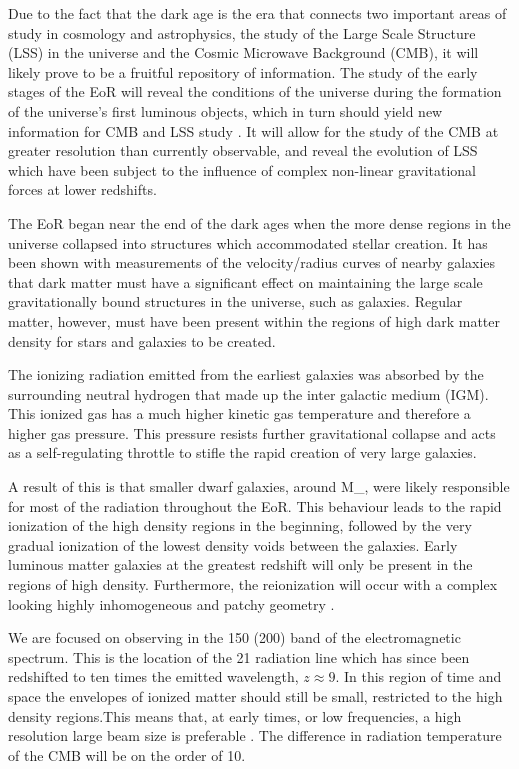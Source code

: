 \documentclass[a4paper,12pt]{article}
\begin{document}
Due to the fact that the dark age is the era that connects two important areas of study in cosmology and astrophysics, the study of the Large Scale Structure (LSS) in the universe and the Cosmic Microwave Background (CMB), it will likely prove to be a fruitful repository of information. The study of the early stages of the EoR will reveal the conditions of the universe during the formation of the universe’s first luminous objects, which in turn should yield new information for CMB and LSS study \citep{21cminthedark}. It will allow for the study of the CMB at greater resolution than currently observable, and reveal the evolution of LSS which have been subject to the influence of complex non-linear gravitational forces at lower redshifts.

The EoR began near the end of the dark ages when the more dense regions in the universe collapsed into structures which accommodated stellar creation. It has been shown with measurements of the velocity/radius curves of nearby galaxies that dark matter must have a significant effect on maintaining the large scale gravitationally bound structures in the universe, such as galaxies. Regular matter, however, must have been present within the regions of high dark matter density for stars and galaxies to be created. 

The ionizing radiation emitted from the earliest galaxies was absorbed by the surrounding neutral hydrogen that made up the inter galactic medium (IGM). This ionized gas has a much higher kinetic gas temperature and therefore a higher gas pressure. This pressure resists further gravitational collapse and acts as a self-regulating throttle to stifle the rapid creation of very large galaxies. 

A result of this is that smaller dwarf galaxies, around \unit{}{M_{\odot}}\citep{theoryandsim}, were likely responsible for most of the radiation throughout the EoR. This behaviour leads to the rapid ionization of the high density regions in the beginning, followed by the very gradual ionization of the lowest density voids between the galaxies. Early luminous matter galaxies at the greatest redshift will only be present in the regions of high density. Furthermore, the reionization will occur with a complex looking highly inhomogeneous and patchy geometry \citep{characteranddetectability}. 

We are focused on observing in the \unit{150}{\mega\hertz} (\unit{200}{\centi\metre}) band of the electromagnetic spectrum. This is the location of the \unit{21}{\centi\metre} radiation line which has since been redshifted to ten times the emitted wavelength, $z \approx 9$. In this region of time and space the envelopes of ionized matter should still be small, restricted to the high density regions.This means that, at early times, or low frequencies, a high resolution large beam size is preferable \citep{characteranddetectability}.  The difference in radiation temperature of the CMB will be on the order of \unit{10}{\milli\kelvin}. 
\end{document}

